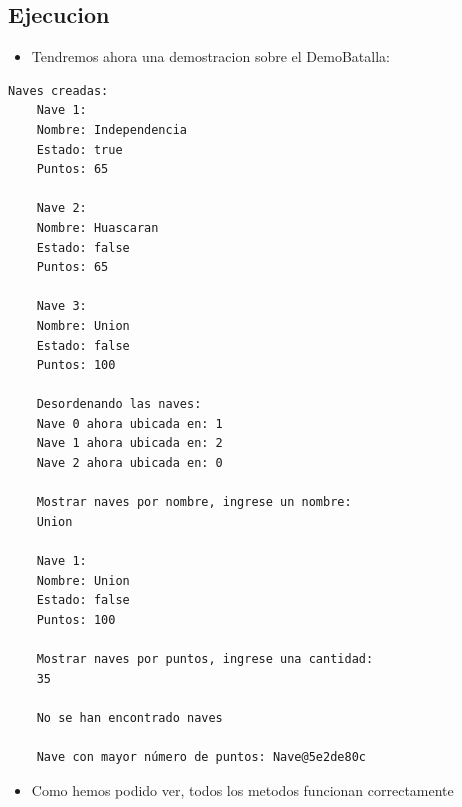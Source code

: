 \documentclass{article}
\begin{document}
    \subsection{Ejecucion}
    \begin{itemize}
        \item Tendremos ahora una demostracion sobre el DemoBatalla:
    \end{itemize}

        \begin{lstlisting}[language=bash, caption={Ejecucion en la linea de comandos}]
    Naves creadas:
    Nave 1:
    Nombre: Independencia
    Estado: true
    Puntos: 65
    
    Nave 2:
    Nombre: Huascaran
    Estado: false
    Puntos: 65
    
    Nave 3:
    Nombre: Union
    Estado: false
    Puntos: 100
    
    Desordenando las naves:
    Nave 0 ahora ubicada en: 1
    Nave 1 ahora ubicada en: 2
    Nave 2 ahora ubicada en: 0
    
    Mostrar naves por nombre, ingrese un nombre:
    Union
    
    Nave 1:
    Nombre: Union
    Estado: false
    Puntos: 100
    
    Mostrar naves por puntos, ingrese una cantidad:
    35
    
    No se han encontrado naves
    
    Nave con mayor número de puntos: Nave@5e2de80c
        \end{lstlisting}
        \begin{itemize}
            \item Como hemos podido ver, todos los metodos funcionan correctamente
        \end{itemize}
\end{document}
